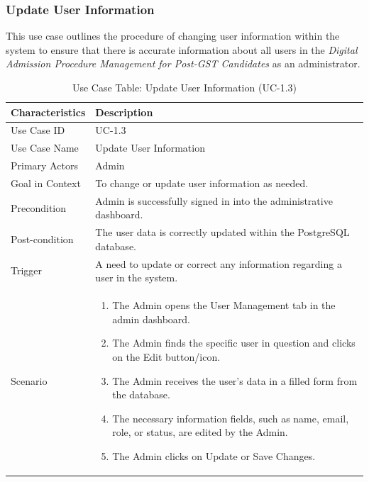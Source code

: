 \subsubsection{Update User Information}

This use case outlines the procedure of changing user information within the system to ensure that there is accurate information about all users in the \textit{Digital Admission Procedure Management for Post-GST Candidates} as an administrator.


\begin{table}[H] %
    \centering
    \small
    \renewcommand{\arraystretch}{1.5}
    \caption{Use Case Table: Update User Information (UC-1.3)}
    \label{tab:use_case_update_user_info}
    \begin{tabularx}{\textwidth}{|l|X|}
        \hline
        \rowcolor[gray]{0.9} {Characteristics} & {Description} \\ \hline
        Use Case ID & UC-1.3 \\ \hline
        Use Case Name & Update User Information \\ \hline
        Primary Actors & Admin \\ \hline
        Goal in Context & To change or update user information as needed. \\ \hline
        Precondition & Admin is successfully signed in into the administrative dashboard. \\ \hline
        Post-condition & The user data is correctly updated within the PostgreSQL database. \\ \hline
        Trigger & A need to update or correct any information regarding a user in the system. \\ \hline
        Scenario & 
        \begin{enumerate}[nosep, leftmargin=*]
            \item The Admin opens the User Management tab in the admin dashboard.
            \item The Admin finds the specific user in question and clicks on the Edit button/icon.
            \item The Admin receives the user’s data in a filled form from the database.
            \item The necessary information fields, such as name, email, role, or status, are edited by the Admin.
            \item The Admin clicks on Update or Save Changes.

\end{enumerate}
\end{tabularx}
\end{table}
